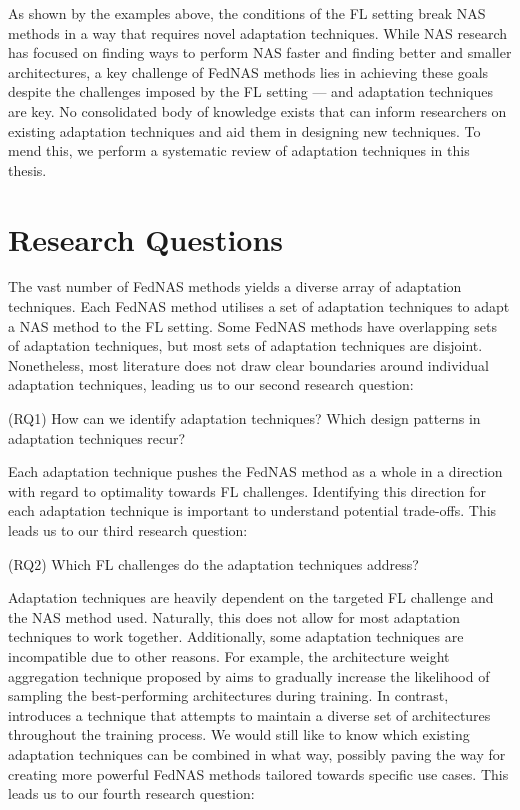 As shown by the examples above, the conditions of the FL setting break NAS methods in a way that requires novel adaptation techniques. While NAS research has focused on finding ways to perform NAS faster and finding better and smaller architectures, a key challenge of FedNAS methods lies in achieving these goals despite the challenges imposed by the FL setting — and adaptation techniques are key. No consolidated body of knowledge exists that can inform researchers on existing adaptation techniques and aid them in designing new techniques. To mend this, we perform a systematic review of adaptation techniques in this thesis. 

\section{Research Questions}

The vast number of FedNAS methods yields a diverse array of adaptation techniques. Each FedNAS method utilises a set of adaptation techniques to adapt a NAS method to the FL setting. Some FedNAS methods have overlapping sets of adaptation techniques, but most sets of adaptation techniques are disjoint. Nonetheless, most literature does not draw clear boundaries around individual adaptation techniques, leading us to our second research question:

\vspace{1em}
(RQ1) How can we identify adaptation techniques? Which design patterns in adaptation techniques recur?
\vspace{1em}

Each adaptation technique pushes the FedNAS method as a whole in a direction with regard to optimality towards FL challenges. Identifying this direction for each adaptation technique is important to understand potential trade-offs. This leads us to our third research question:

\vspace{1em}
(RQ2) Which FL challenges do the adaptation techniques address?
\vspace{1em}

Adaptation techniques are heavily dependent on the targeted FL challenge and the NAS method used. Naturally, this does not allow for most adaptation techniques to work together. Additionally, some adaptation techniques are incompatible due to other reasons. For example, the architecture weight aggregation technique proposed by \cite{efnas_2024} aims to gradually increase the likelihood of sampling the best-performing architectures during training. In contrast, \cite{superfednas_2024} introduces a technique that attempts to maintain a diverse set of architectures throughout the training process. We would still like to know which existing adaptation techniques can be combined in what way, possibly paving the way for creating more powerful FedNAS methods tailored towards specific use cases. This leads us to our fourth research question:

